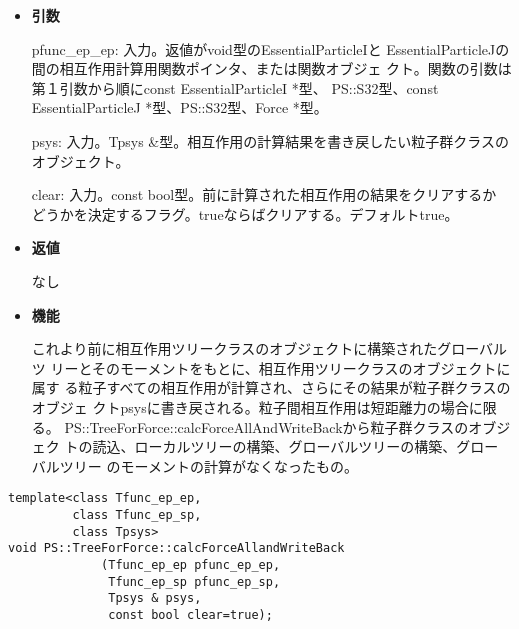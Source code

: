 \begin{itemize}

\item {\bf 引数}

pfunc\_ep\_ep: 入力。返値がvoid型のEssentialParticleIと
EssentialParticleJの間の相互作用計算用関数ポインタ、または関数オブジェ
クト。関数の引数は第１引数から順にconst EssentialParticleI *型、
PS::S32型、const EssentialParticleJ *型、PS::S32型、Force *型。

psys: 入力。Tpsys \&型。相互作用の計算結果を書き戻したい粒子群クラスの
オブジェクト。

clear: 入力。const bool型。前に計算された相互作用の結果をクリアするか
どうかを決定するフラグ。trueならばクリアする。デフォルトtrue。

\item {\bf 返値}

なし

\item {\bf 機能}

これより前に相互作用ツリークラスのオブジェクトに構築されたグローバルツ
リーとそのモーメントをもとに、相互作用ツリークラスのオブジェクトに属す
る粒子すべての相互作用が計算され、さらにその結果が粒子群クラスのオブジェ
クトpsysに書き戻される。粒子間相互作用は短距離力の場合に限る。
PS::TreeForForce::calcForceAllAndWriteBackから粒子群クラスのオブジェク
トの読込、ローカルツリーの構築、グローバルツリーの構築、グローバルツリー
のモーメントの計算がなくなったもの。

\end{itemize}

\begin{screen}
\begin{verbatim}
template<class Tfunc_ep_ep,
         class Tfunc_ep_sp,
         class Tpsys>
void PS::TreeForForce::calcForceAllandWriteBack
             (Tfunc_ep_ep pfunc_ep_ep,
              Tfunc_ep_sp pfunc_ep_sp,
              Tpsys & psys,
              const bool clear=true);
\end{verbatim}
\end{screen}

